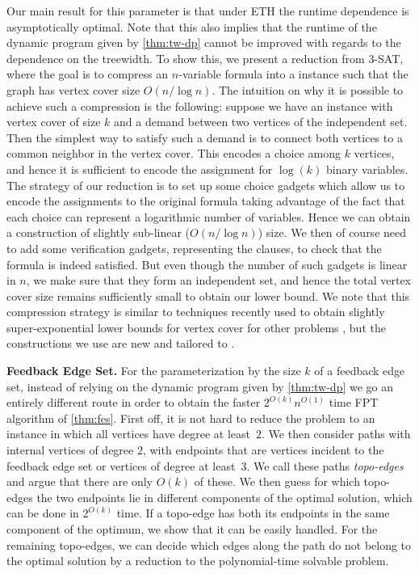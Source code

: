 Our main result for this parameter is that under ETH the runtime dependence
is asymptotically optimal. Note that this also implies that the runtime of the dynamic program
given by \autoref{thm:tw-dp} cannot be improved with regards to the dependence
on the treewidth. To show this, we present a reduction from \textsc{3-SAT}, where the
goal is to compress an $n$-variable formula into a \SF
instance such that the graph has vertex cover size $O(n/\log n)$. The intuition on why
it is possible to achieve such a compression is the following: suppose we have
an instance with vertex cover of size $k$ and a demand between two vertices of
the independent set. Then the simplest way to satisfy such a demand is to
connect both vertices to a common neighbor in the vertex cover. This encodes a
choice among $k$ vertices, and hence it is sufficient to encode the assignment for
$\log(k)$ binary variables. The strategy of our reduction is to set up some
choice gadgets which allow us to encode the assignments to the original formula
taking advantage of the fact that each choice can represent a logarithmic
number of variables. Hence we can obtain a construction of slightly sub-linear
($O(n/\log n)$) size.  We then of course need to add some verification gadgets,
representing the clauses, to check that the formula is indeed satisfied. But
even though the number of such gadgets is linear in $n$, we make sure that they
form an independent set, and hence the total vertex cover size remains
sufficiently small to obtain our lower bound. We note that this compression
strategy is similar to techniques recently used to obtain slightly
super-exponential lower bounds for vertex cover for other problems
\cite{LampisMV23,LampisV23}, but the constructions we use are new and tailored to
\SF.

\smallskip
\textbf{Feedback Edge Set.} For the parameterization by the size $k$ of a
feedback edge set, instead of relying on the dynamic program given by
\autoref{thm:tw-dp} we go an entirely different route in order to obtain the
faster $2^{O(k)}n^{O(1)}$ time FPT algorithm of \autoref{thm:fes}. First off,
it is not hard to reduce the \SF problem to an instance in which all vertices
have degree at least~$2$.  We then consider paths with internal vertices of
degree $2$, with endpoints that are vertices incident to the feedback edge set
or vertices of degree at least~$3$.  We call these paths \emph{topo-edges} and
argue that there are only $O(k)$ of these. We then guess for which topo-edges
the two endpoints lie in different components of the optimal \SF solution,
which can be done in $2^{O(k)}$ time.  If a topo-edge has both its endpoints in
the same component of the optimum, we show that it can be easily handled. For
the remaining topo-edges, we can decide which edges along the path do not
belong to the optimal solution by a reduction to the polynomial-time solvable
 problem.




